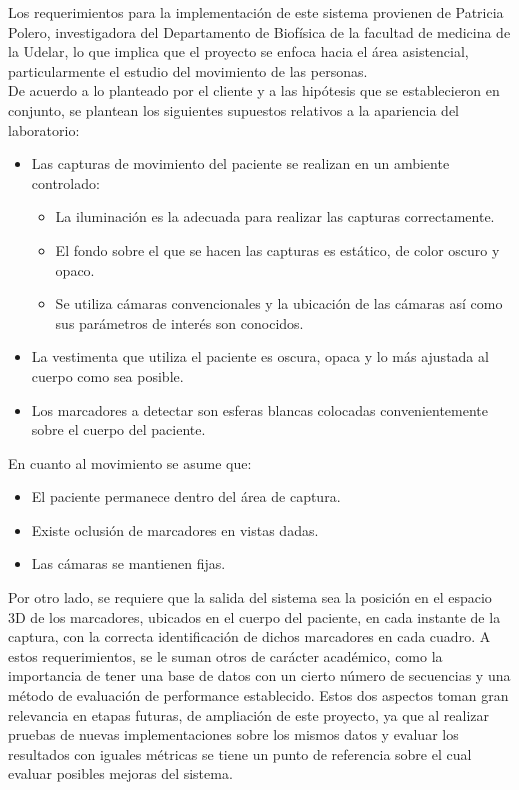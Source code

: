 Los requerimientos para la implementación de este sistema provienen de Patricia Polero, investigadora del Departamento de Biofísica de la facultad de medicina de la Udelar, lo que implica que el proyecto se enfoca hacia el área asistencial, particularmente el estudio del movimiento de las personas.
\\ 

De acuerdo a lo planteado por el cliente y a las hipótesis que se establecieron en conjunto, se plantean los siguientes supuestos relativos a la apariencia del laboratorio:
\begin{itemize}
\item Las capturas de movimiento del paciente se realizan en un ambiente controlado:\vspace{-0.2cm}
	\begin{itemize}
		 \item La iluminación es la adecuada para realizar las  capturas correctamente.
		 \item El fondo sobre el que se hacen las capturas es estático, de color oscuro y opaco.		 
		 \item Se utiliza cámaras convencionales y la ubicación de las cámaras así como sus parámetros de interés son conocidos.
	\end{itemize}
	\vspace{-0.2cm}
\item La vestimenta que utiliza el paciente es oscura, opaca y lo más ajustada al cuerpo como sea posible.\vspace{-0.1cm}
\item Los marcadores a detectar son esferas blancas colocadas convenientemente sobre el cuerpo del paciente.
\end{itemize}

En cuanto al movimiento se asume que:
\begin{itemize}
\item El paciente permanece dentro del área de captura.\vspace{-0.1cm}
\item Existe oclusión de marcadores en vistas dadas.\vspace{-0.1cm}
\item Las cámaras se mantienen fijas.
\end{itemize}

Por otro lado, se requiere que la salida del sistema sea la posición en el espacio 3D de los marcadores, ubicados en el cuerpo del paciente, en cada instante de la captura, con la correcta identificación de dichos marcadores en cada cuadro. A estos requerimientos, se le suman otros de carácter académico, como la importancia de tener una base de datos con un cierto número de secuencias y una método de evaluación de performance establecido. Estos dos aspectos toman gran relevancia en etapas futuras, de ampliación de este proyecto, ya que al realizar pruebas  de nuevas implementaciones sobre los mismos datos y evaluar los resultados con iguales métricas se tiene un punto de referencia sobre el cual evaluar posibles mejoras del sistema.
\\ 

